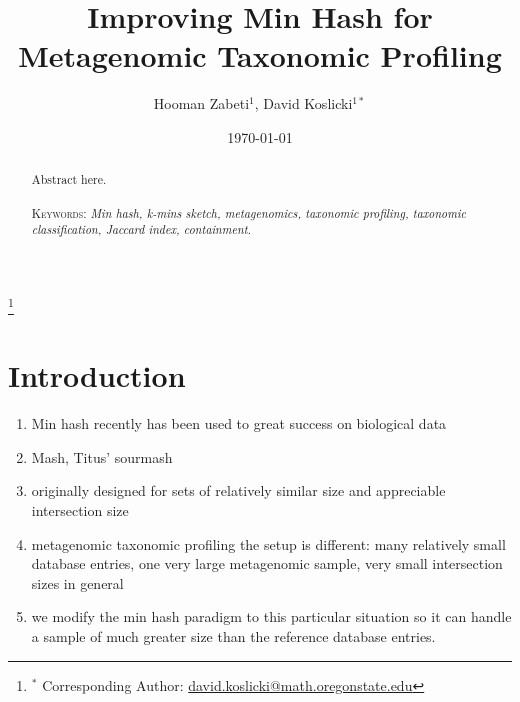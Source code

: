 \documentclass[11pt]{amsart}
\theoremstyle{remark}
\numberwithin{equation}{section}
\begin{document}
\title[Improving Min Hash]{Improving Min Hash for Metagenomic Taxonomic Profiling} %


\author{Hooman Zabeti${}^{1}$, David Koslicki${}^{1*}$}
\address{${}^1$ Mathematics Department, Oregon State University, Corvallis, OR.}
\thanks{${}^*$ Corresponding Author: \url{david.koslicki@math.oregonstate.edu}}





\date{\today}
\begin{abstract}
Abstract here.  \\\\
\smallskip
\noindent \textsc{Keywords}: \emph{Min hash, k-mins sketch, metagenomics, taxonomic profiling, taxonomic classification, Jaccard index, containment}.
\end{abstract}
\maketitle


\section{Introduction}
\begin{enumerate}
\item Min hash recently has been used to great success on biological data
\item Mash, Titus' sourmash
\item originally designed for sets of relatively similar size and appreciable intersection size
\item metagenomic taxonomic profiling the setup is different: many relatively small database entries, one very large metagenomic sample, very small intersection sizes in general
\item we modify the min hash paradigm to this particular situation so it can handle a sample of much greater size than the reference database entries.
\end{enumerate}
\end{document}

